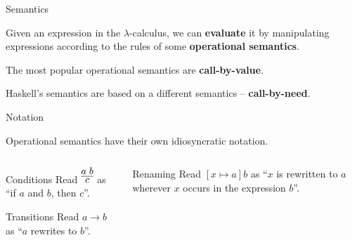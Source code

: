 %
\begin{frame}{Semantics}

Given an expression in the $\lambda$-calculus, we can \textbf{evaluate} it by
manipulating expressions according to the rules of some \textbf{operational
semantics}.

The most popular operational semantics are \textbf{call-by-value}.

Haskell's semantics are based on a different semantics -- \textbf{call-by-need}.

\end{frame}

%
\begin{frame}{Notation}

Operational semantics have their own idiosyncratic notation.

\begin{columns}[t]
\begin{column}{0.5\textwidth}

\begin{block}{Conditions}
Read $\infer{c}{a \; b}$ as ``if $a$ and $b$, then $c$''.
\end{block}

\begin{block}{Transitions}
Read $a \to b$ as ``$a$ rewrites to $b$''.
\end{block}

\end{column}
\begin{column}{0.4\textwidth}

\begin{block}{Renaming}
Read $[x \mapsto a] b$ as ``$x$ is rewritten to $a$ wherever $x$ occurs in the 
expression $b$''.
\end{block}

\end{column}
\end{columns}

\end{frame}


